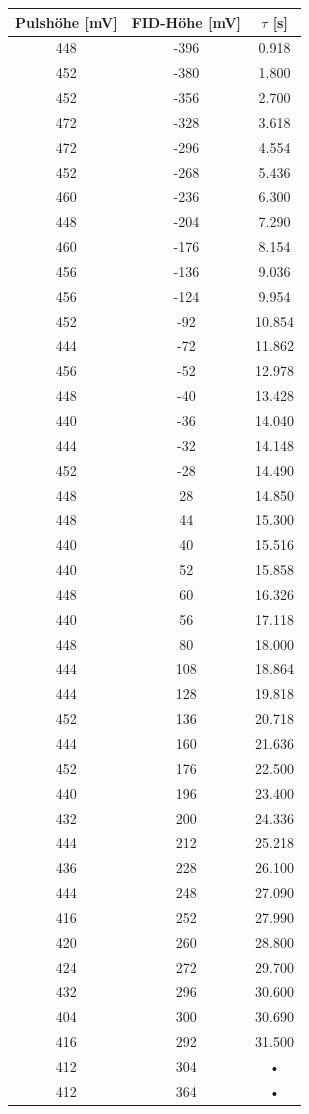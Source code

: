 \documentclass[12pt,a4paper]{article}
\begin{document}
\begin{tabular}{|c|c|c|}
\hline 
Pulshöhe [mV] & FID-Höhe [mV] & $\tau$ [s] \\ 
\hline 
448 & -396 & 0.918 \\ 
\hline 
452 & -380 & 1.800 \\ 
\hline 
452 & -356 & 2.700 \\ 
\hline 
472 & -328 & 3.618 \\ 
\hline 
472 & -296 & 4.554 \\ 
\hline 
452 & -268 & 5.436 \\ 
\hline 
460 & -236 & 6.300 \\ 
\hline 
448 & -204 & 7.290 \\ 
\hline 
460 & -176 & 8.154 \\ 
\hline 
456 & -136 & 9.036 \\ 
\hline 
456 & -124 & 9.954 \\ 
\hline 
452 & -92 & 10.854 \\ 
\hline 
444 & -72 & 11.862 \\ 
\hline 
456 & -52 & 12.978 \\ 
\hline 
448 & -40 & 13.428 \\ 
\hline 
440 & -36 & 14.040 \\ 
\hline 
444 & -32 & 14.148 \\ 
\hline 
452 & -28 & 14.490 \\ 
\hline 
448 & 28 & 14.850 \\ 
\hline 
448 & 44 & 15.300 \\ 
\hline 
440 & 40 & 15.516 \\ 
\hline 
440 & 52 & 15.858 \\ 
\hline 
448 & 60 & 16.326 \\ 
\hline 
440 & 56 & 17.118 \\ 
\hline 
448 & 80 & 18.000 \\ 
\hline 
444 & 108 & 18.864 \\ 
\hline 
444 & 128 & 19.818 \\ 
\hline 
452 & 136 & 20.718 \\ 
\hline 
444 & 160 & 21.636 \\ 
\hline 
452 & 176 & 22.500 \\ 
\hline 
440 & 196 & 23.400 \\ 
\hline 
432 & 200 & 24.336 \\ 
\hline 
444 & 212 & 25.218 \\ 
\hline 
436 & 228 & 26.100 \\ 
\hline 
444 & 248 & 27.090 \\ 
\hline 
416 & 252 & 27.990 \\ 
\hline 
420 & 260 & 28.800 \\ 
\hline 
424 & 272 & 29.700 \\ 
\hline 
432 & 296 & 30.600 \\ 
\hline 
404 & 300 & 30.690 \\ 
\hline 
416 & 292 & 31.500 \\ 
\hline 
412 & 304 & • \\ 
\hline 
412 & 364 & • \\ 
\hline 
\end{tabular} 
\end{document}
